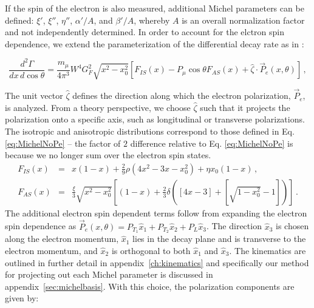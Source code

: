 If the spin of the electron is also measured, additional Michel parameters can be defined: $\xi'$, $\xi''$, $\eta''$, $\alpha'/A$, and $\beta'/A$, whereby $A$ is an overall normalization factor and not independently determined. In order to account for the elctron spin dependence, we extend the parameterization of the differential decay rate as in \cite{particle2024review}:

\begin{equation}
\frac{d^2\Gamma}{dx\, d\cos\theta}=\frac{m_\mu }{4\pi^3} W^4G_F^2\sqrt{x^2-x_0^2}\left[F_{IS}(x)-P_\mu\cos\theta F_{AS}(x)+\hat \zeta\cdot \vec P_e(x,\theta)\right]\, ,
\end{equation}

The unit vector $\hat\zeta$ defines the direction along which the electron polarization, $\vec P_e$, is analyzed. From a theory perspective, we choose $\hat\zeta$ such that it projects the polarization onto a specific axis, such as longitudinal or transverse polarizations. The isotropic and anisotropic distributions correspond to those defined in Eq. \ref{eq:MichelNoPe} -- the factor of $2$ difference relative to Eq. \ref{eq:MichelNoPe} is because we no longer sum over the electron spin states.
\begin{eqnarray}
F_{IS}(x)&=&x(1-x)+\frac{2}{9}\rho(4x^2-3x-x_0^2)+\eta x_0(1-x)\, ,\\
F_{AS}(x)&=&\frac{\xi}{3}\sqrt{x^2-x_0^2}\left[(1-x)+\frac{2}{3}\delta\left(\left[4x-3\right]+\left[\sqrt{1-x_0^2}-1\right]\right)\right]\, .
\end{eqnarray}
%
The additional electron spin dependent terms follow from expanding the electron spin dependence as $\vec P_e(x,\theta)=P_{T_1}\hat x_1+P_{T_2}\hat x_2+P_L\hat x_3$. The direction $\hat x_3$ is chosen along the electron momentum, $\hat x_1$ lies in the decay plane and is transverse to the electron momentum, and $\hat x_2$ is orthogonal to both $\hat x_1$ and $\hat x_3$. The kinematics are outlined in further detail in appendix~\ref{ch:kinematics} and specifically our method for projecting out each Michel parameter is discussed in appendix~\ref{sec:michelbasis}. With this choice, the polarization components are given by:
%
